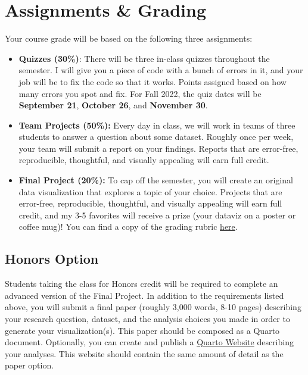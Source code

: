 \documentclass[11pt, letterpaper]{article}
\begin{document}
\section*{Assignments \& Grading}

Your course grade will be based on the following three assignments:

\begin{itemize}
	\item \textbf{Quizzes (30\%)}: There will be three in-class quizzes throughout the semester. I will give you a piece of code with a bunch of errors in it, and your job will be to fix the code so that it works. Points assigned based on how many errors you spot and fix. For Fall 2022, the quiz dates will be \textbf{September 21}, \textbf{October 26}, and \textbf{November 30}.
	\item \textbf{Team Projects (50\%):} Every day in class, we will work in teams of three students to answer a question about some dataset. Roughly once per week, your team will submit a report on your findings. Reports that are error-free, reproducible, thoughtful, and visually appealing will earn full credit.
	\item \textbf{Final Project (20\%):} To cap off the semester, you will create an original data visualization that explores a topic of your choice. Projects that are error-free, reproducible, thoughtful, and visually appealing will earn full credit, and my 3-5 favorites will receive a prize (your dataviz on a poster or coffee mug)! You can find a copy of the grading rubric \href{https://joeornstein.github.io/pols-3230/syllabus/POLS-3230-final-rubric.xlsx}{here}.
\end{itemize}

\subsection*{Honors Option}

Students taking the class for Honors credit will be required to complete an advanced version of the Final Project. In addition to the requirements listed above, you will submit a final paper (roughly 3,000 words, 8-10 pages) describing your research question, dataset, and the analysis choices you made in order to generate your visualization(s). This paper should be composed as a Quarto document. Optionally, you can create and publish a \href{https://quarto.org/docs/websites/}{Quarto Website} describing your analyses. This website should contain the same amount of detail as the paper option.
\end{document}
